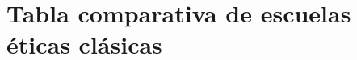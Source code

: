 \documentclass[
	spanish, %
	letterpaper, oneside
]{article}
\begin{document}
\section{Tabla comparativa de escuelas éticas clásicas}


\end{document}
